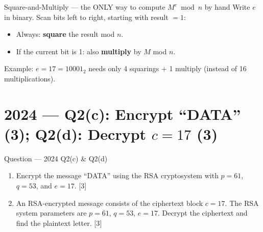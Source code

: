 \documentclass[12pt,a4paper]{article}
\begin{document}
\begin{keybox}{Square-and-Multiply --- the ONLY way to compute $M^e \bmod n$ by hand}
Write $e$ in binary. Scan bits left to right, starting with result $=1$:
\begin{itemize}[noitemsep]
  \item Always: \textbf{square} the result mod $n$.
  \item If the current bit is 1: also \textbf{multiply} by $M$ mod $n$.
\end{itemize}
Example: $e=17=10001_2$ needs only 4 squarings + 1 multiply (instead of 16 multiplications).
\end{keybox}

\section{2024 --- Q2(c): Encrypt ``DATA'' (3); Q2(d): Decrypt $c=17$ (3)}

\begin{qbox}{Question --- 2024 Q2(c) \& Q2(d)}
\begin{enumerate}[label=(\alph*)]
  \item[(c)] Encrypt the message ``DATA'' using the RSA cryptosystem with $p=61$, $q=53$, and $e=17$. \hfill [3]
  \item[(d)] An RSA-encrypted message consists of the ciphertext block $c=17$. The RSA system parameters are $p=61$, $q=53$, $e=17$. Decrypt the ciphertext and find the plaintext letter. \hfill [3]
\end{enumerate}
\end{qbox}
\end{document}
